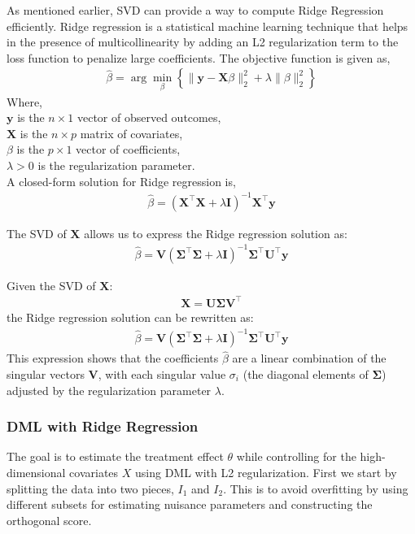 As mentioned earlier, SVD can provide a way to compute Ridge Regression efficiently. Ridge regression is a statistical machine learning technique that helps in the presence of multicollinearity by adding an L2 regularization term to the loss function to penalize large coefficients. The objective function is given as,
\begin{align}
\hat{\beta} = \arg\min_{\beta} \left\{ \|\mathbf{y} - \mathbf{X}\beta\|_2^2 + \lambda \|\beta\|_2^2 \right\}
\end{align}
Where,\\
\(\mathbf{y}\) is the \(n \times 1\) vector of observed outcomes, \\
\(\mathbf{X}\) is the \(n \times p\) matrix of covariates, \\
\(\beta\) is the \(p \times 1\) vector of coefficients, \\
\(\lambda > 0\) is the regularization parameter. \\
A closed-form solution for Ridge regression is,
\begin{align}
\hat{\beta} = (\mathbf{X}^\top \mathbf{X} + \lambda \mathbf{I})^{-1} \mathbf{X}^\top \mathbf{y}
\end{align}


The SVD of \(\mathbf{X}\) allows us to express the Ridge regression solution as:
\begin{align}
\hat{\beta} = \mathbf{V} (\boldsymbol{\Sigma}^\top \boldsymbol{\Sigma} + \lambda \mathbf{I})^{-1} \boldsymbol{\Sigma}^\top \mathbf{U}^\top \mathbf{y}
\end{align}

Given the SVD of \(\mathbf{X}\):
\begin{align}
\mathbf{X} = \mathbf{U} \boldsymbol{\Sigma} \mathbf{V}^\top
\end{align}
the Ridge regression solution can be rewritten as:
\begin{align}
\hat{\beta} = \mathbf{V} (\boldsymbol{\Sigma}^\top \boldsymbol{\Sigma} + \lambda \mathbf{I})^{-1} \boldsymbol{\Sigma}^\top \mathbf{U}^\top \mathbf{y}
\end{align}
This expression shows that the coefficients \(\hat{\beta}\) are a linear combination of the singular vectors \(\mathbf{V}\), with each singular value \(\sigma_i\) (the diagonal elements of \(\boldsymbol{\Sigma}\)) adjusted by the regularization parameter \(\lambda\).
\subsubsection{DML with Ridge Regression}
The goal is to estimate the treatment effect \(\theta\) while controlling for the high-dimensional covariates \(X\) using DML with L2 regularization. First we start by splitting the data into two pieces, \(I_1\) and \(I_2\). This is to avoid overfitting by using different subsets for estimating nuisance parameters and constructing the orthogonal score.
